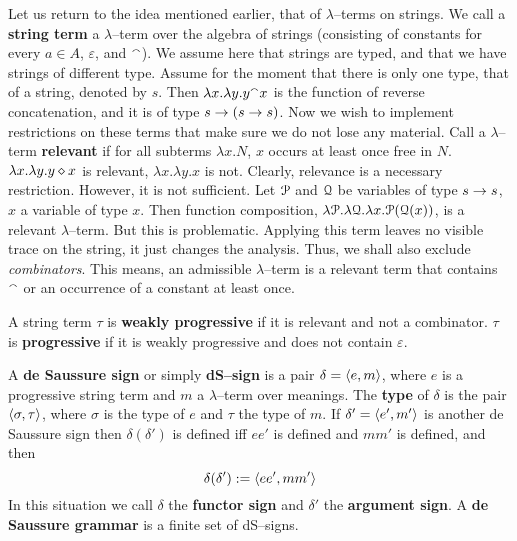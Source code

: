 Let us return to the idea mentioned earlier, that of
$\lambda$--terms on strings. We call a \textbf{string term}
a $\lambda$--term over the algebra of strings (consisting of constants 
for every $a \in A$, $\varepsilon$, and ${^{\smallfrown}}$). We assume here that
strings are typed, and that we have strings of different type. Assume
for the moment that there is only one type, that of a string, denoted
by $s$. Then $\lambda x.\lambda y. y {^{\smallfrown}} x$ is the function of
reverse concatenation, and it is of type $s \rightarrow (s \rightarrow s)$. Now we
wish to implement restrictions on these terms that make sure we
do not lose any material. Call a $\lambda$--term 
\textbf{relevant} if for all subterms $\lambda x.N$, $x$ occurs at 
least once free in $N$. $\lambda x.\lambda y. y \diamond x$ is relevant, 
$\lambda x.  \lambda y. x$ is not. Clearly, relevance is a necessary 
restriction. However, it is not sufficient. Let $\mathcal{P}$ and $\mathcal{Q}$ be variables 
of type $s \rightarrow s$, $x$ a variable of type $x$. Then function composition,
$\lambda \mathcal{P}.\lambda \mathcal{Q}. \lambda x.\mathcal{P}(\mathcal{Q}(x))$, is a  relevant
$\lambda$--term. But this is problematic. Applying this term leaves
no visible trace on the string, it just changes the analysis.
Thus, we shall also exclude {\it combinators}. This means, an
admissible $\lambda$--term is a relevant term that contains
${^{\smallfrown}}$ or an occurrence of a constant at least once.
\begin{defn}
A string term $\tau$ is \textbf{weakly progressive} if it is relevant 
and not a combinator. $\tau$ is \textbf{progressive} if it is weakly 
progressive and does not contain $\varepsilon$.
\end{defn}
\begin{defn}
A \textbf{de Saussure sign} or simply \textbf{dS--sign} is a pair
$\delta = \langle e,m\rangle$, where $e$ is a progressive string term
and $m$ a $\lambda$--term over meanings. The \textbf{type} of
$\delta$ is the pair $\langle \sigma, \tau\rangle$, where $\sigma$ is the
type of $e$ and $\tau$ the type of $m$. If $\delta' =
\langle e', m'\rangle$ is another de Saussure sign then $\delta(\delta')$
is defined iff $ee'$ is defined and $mm'$ is defined,
and then
\begin{equation}
\delta(\delta') := \langle ee', mm'\rangle
\end{equation}
In this situation we call $\delta$ the \textbf{functor sign} and
$\delta'$ the \textbf{argument sign}. A \textbf{de Saussure grammar}
is a finite set of dS--signs.
\end{defn}
